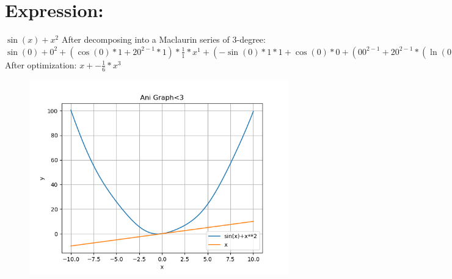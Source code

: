 \documentclass{article}
\begin{document}
\section{Expression:}
$\sin(x)+{x}^{2}$\newline\newline
After decomposing into a Maclaurin series of 3-degree:\newline
$\sin(0)+{0}^{2}+(\cos(0)*1+2{0}^{2-1}*1)*\frac{1}{1}*{x}^{1}+(-\sin(0)*1*1+\cos(0)*0+(0{0}^{2-1}+2{0}^{2-1}*(\ln(0)*(0-0)+\frac{1}{0}*1*(2-1)))*1+2{0}^{2-1}*0)*\frac{1}{2}*{x}^{2}+(((0\sin(0)+-\cos(0)*1)*1+-\sin(0)*0)*1+-\sin(0)*1*0+-\sin(0)*1*0+\cos(0)*0+(0{0}^{2-1}+0{0}^{2-1}*(\ln(0)*(0-0)+\frac{1}{0}*1*(2-1))+0{0}^{2-1}*(\ln(0)*(0-0)+\frac{1}{0}*1*(2-1))+2({0}^{2-1}*(\ln(0)*(0-0)+\frac{1}{0}*1*(2-1))*(\ln(0)*(0-0)+\frac{1}{0}*1*(2-1))+{0}^{2-1}*(\frac{1}{0}*1*(0-0)+\ln(0)*(0-0)+(\frac{00-11}{00}*1+\frac{1}{0}*0)*(2-1)+\frac{1}{0}*1*(0-0))))*1+(0{0}^{2-1}+2{0}^{2-1}*(\ln(0)*(0-0)+\frac{1}{0}*1*(2-1)))*0+(0{0}^{2-1}+2{0}^{2-1}*(\ln(0)*(0-0)+\frac{1}{0}*1*(2-1)))*0+2{0}^{2-1}*0)*\frac{1}{6}*{x}^{3}$\newline\newline
After optimization:\newline
$x+-\frac{1}{6}*{x}^{3}$\newline\newline
\begin{figure} [!ht]
\begin{flushleft}
\includegraphics[scale = 0.700000]{figs/fig4.png}
\end{flushleft}
\end{figure}
\end{document}
